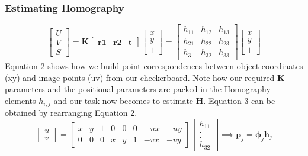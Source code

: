\documentclass[titlepage]{article}
\begin{document}
\subsubsection{Estimating Homography}
\begin{equation}\label{uv-to-xy}
\begin{bmatrix}
  U\\ 
  V\\ 
  S 
  \end{bmatrix}
        = \textbf{K}
         \begin{bmatrix}
 \textbf{r1} & \textbf{r2} & \textbf{t}
         \end{bmatrix}
        \begin{bmatrix}
  x\\ 
  y\\ 
  1 
  \end{bmatrix}    
       =  \begin{bmatrix}
  h_{11}  & h_{12} & h_{13} \\ 
  h_{21}  & h_{22} & h_{23} \\ 
  h_{3_1}  & h_{32} & h_{33} 
  \end{bmatrix}
          \begin{bmatrix}
  x\\ 
  y\\ 
  1 
  \end{bmatrix}    
        \end{equation}
Equation 2 shows how we build point correspondences between object coordinates (xy) and image points (uv) from our checkerboard. Note how our required \textbf{K} parameters and the positional parameters are packed in the Homography elements $h_{i,j}$ and our task now becomes to estimate \textbf{H}. Equation 3 can be obtained by rearranging Equation 2.
%
\begin{equation}
    \label{Regressor}
  \begin{bmatrix}
  u\\ 
  v
  \end{bmatrix}
        = 
       \begin{bmatrix}
 x & y & 1 & 0 & 0 & 0 & -ux & -uy \\
 0 & 0 & 0 & x & y & 1 & -vx & -vy
  \end{bmatrix}
  \begin{bmatrix}
  h_{11}\\ 
    .\\
    .\\
  h_{32}
  \end{bmatrix}
 \implies \mathbf{p}_{j} = \mathbf{\phi}_{j}  \mathbf{h}_{j}
      \end{equation}
\end{document}
